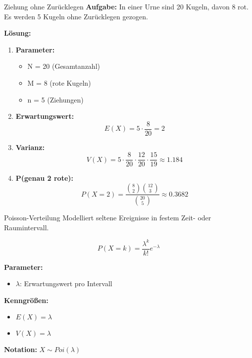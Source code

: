 \begin{example}{Ziehung ohne Zurücklegen}
\textbf{Aufgabe:} In einer Urne sind 20 Kugeln, davon 8 rot. Es werden 5 Kugeln ohne Zurücklegen gezogen. 

\textbf{Lösung:}
\begin{enumerate}
\item \textbf{Parameter:}
   \begin{itemize}
   \item N = 20 (Gesamtanzahl)
   \item M = 8 (rote Kugeln)
   \item n = 5 (Ziehungen)
   \end{itemize}

\item \textbf{Erwartungswert:}
   $$E(X) = 5 \cdot \frac{8}{20} = 2$$

\item \textbf{Varianz:}
   $$V(X) = 5 \cdot \frac{8}{20} \cdot \frac{12}{20} \cdot \frac{15}{19} \approx 1.184$$

\item \textbf{P(genau 2 rote):}
   $$P(X=2) = \frac{\binom{8}{2}\binom{12}{3}}{\binom{20}{5}} \approx 0.3682$$
\end{enumerate}
\end{example}

\begin{definition}{Poisson-Verteilung}
Modelliert seltene Ereignisse in festem Zeit- oder Raumintervall.

$$P(X=k) = \frac{\lambda^k}{k!}e^{-\lambda}$$

\textbf{Parameter:}
\begin{itemize}
    \item $\lambda$: Erwartungswert pro Intervall
\end{itemize}

\textbf{Kenngrößen:}
\begin{itemize}
    \item $E(X) = \lambda$
    \item $V(X) = \lambda$
\end{itemize}

\textbf{Notation:} $X \sim Poi(\lambda)$
\end{definition}

